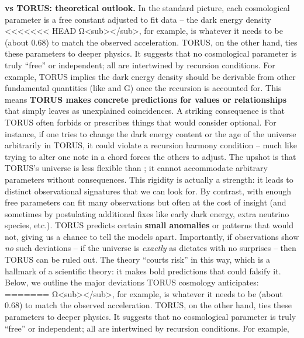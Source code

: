 \documentclass[]{article}
\begin{document}
\textbf{\LambdaCDM vs TORUS: theoretical outlook.} In the standard picture,
each cosmological parameter is a free constant adjusted to fit data --
the dark energy density
<<<<<<< HEAD
Ω\textless sub\textgreater \Lambda\textless/sub\textgreater, for example, is
whatever it needs to be (about 0.68) to match the observed acceleration.
TORUS, on the other hand, ties these parameters to deeper physics. It
suggests that no cosmological parameter is truly ``free'' or
independent; all are intertwined by recursion conditions. For example,
TORUS implies the dark energy density should be derivable from other
fundamental quantities (like \alpha and G) once the recursion is accounted
for\hspace{0pt}. This means \textbf{TORUS makes concrete predictions for
values or relationships} that \LambdaCDM simply leaves as unexplained
coincidences. A striking consequence is that TORUS often forbids or
prescribes things that \LambdaCDM would consider optional. For instance, if
one tries to change the dark energy content or the age of the universe
arbitrarily in TORUS, it could violate a recursion harmony condition --
much like trying to alter one note in a chord forces the others to
adjust. The upshot is that TORUS's universe is less flexible than \LambdaCDM;
it cannot accommodate arbitrary parameters without consequences. This
rigidity is actually a strength: it leads to distinct observational
signatures that we can look for. By contrast, \LambdaCDM with enough free
parameters can fit many observations but often at the cost of insight
(and sometimes by postulating additional fixes like early dark energy,
extra neutrino species, etc.). TORUS predicts certain \textbf{small
anomalies} or patterns that \LambdaCDM would not, giving us a chance to tell
the models apart. Importantly, if observations show \emph{no} such
deviations -- if the universe is \emph{exactly} as \LambdaCDM dictates with no
surprises -- then TORUS can be ruled out. The theory ``courts risk'' in
this way\hspace{0pt}, which is a hallmark of a scientific theory: it
makes bold predictions that could falsify it. Below, we outline the
major deviations TORUS cosmology anticipates:
=======
Ω\textless{}sub\textgreater{}\Lambda\textless{}/sub\textgreater{}, for
example, is whatever it needs to be (about 0.68) to match the observed
acceleration. TORUS, on the other hand, ties these parameters to deeper
physics. It suggests that no cosmological parameter is truly ``free'' or
independent; all are intertwined by recursion conditions. For example,
\end{document}
